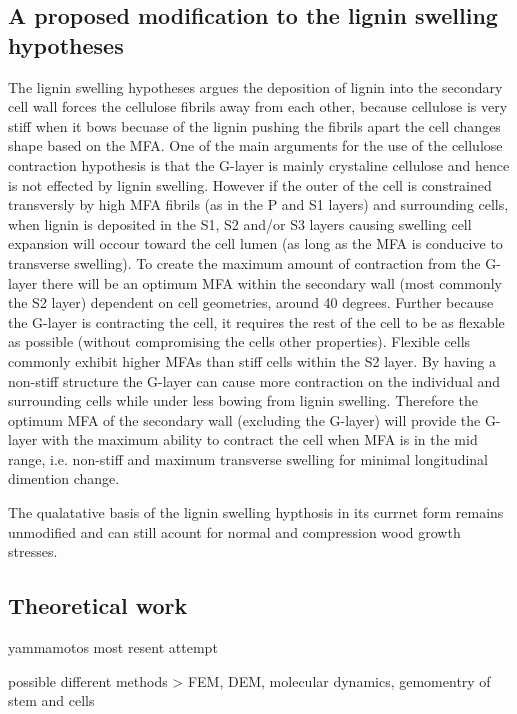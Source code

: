 \documentclass{article}
\begin{document}
\subsection{A proposed modification to the lignin swelling hypotheses}
The lignin swelling hypotheses argues the deposition of lignin into the
secondary cell wall forces the cellulose fibrils away from each other, because
cellulose is very stiff when it bows becuase of the lignin pushing the fibrils
apart the cell changes shape based on the MFA. One of the main arguments for the
use of the cellulose contraction hypothesis is that the G-layer is mainly
crystaline cellulose and hence is not effected by lignin swelling. However if
the outer of the cell is constrained transversly by high MFA fibrils (as in the
P and S1 layers) and surrounding cells, when lignin is deposited in the S1, S2
and/or S3 layers causing swelling cell expansion will occour toward the cell
lumen (as long as the MFA is conducive to transverse swelling). To create the
maximum amount of contraction from the G-layer there will be an optimum MFA
within the secondary wall (most commonly the S2 layer) dependent on cell
geometries, around 40 degrees. Further because the G-layer is contracting the
cell, it requires the rest of the cell to be as flexable as possible (without
compromising the cells other properties). Flexible cells commonly exhibit higher
MFAs than stiff cells within the S2 layer. By having a non-stiff structure the
G-layer can cause more contraction on the individual and surrounding cells while
under less bowing from lignin swelling. Therefore the optimum MFA of the secondary
wall (excluding the G-layer) will provide the G-layer with the maximum ability
to contract the cell when MFA is in the mid range, i.e. non-stiff and maximum
transverse swelling for minimal longitudinal dimention change.

The qualatative basis of the lignin swelling hypthosis in its currnet form
remains unmodified and can still acount for normal and compression wood growth
stresses.



\subsection{Theoretical work}

yammamotos most resent attempt

possible different methods > FEM, DEM, molecular dynamics, gemomentry of stem
and cells
\end{document}
